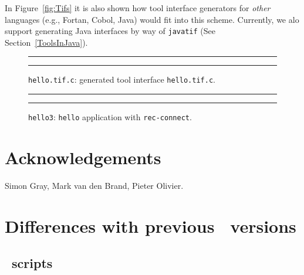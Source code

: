 \documentclass[a4,twoside,noweb]{article} %
\begin{document}
In Figure~\ref{fig:Tifs} it is also shown how tool interface generators for
{\em other} languages (e.g., Fortan, Cobol, Java) would fit into this scheme.
Currently, we alo support generating Java interfaces by way of {\tt javatif}
(See Section~\ref{ToolsInJava}).

\begin{figure}[tb]
\rule{\textwidth}{0.5mm}

  \caption{{\tt hello.tif.c}: generated tool interface {\tt hello.tif.c}.}
  \label{fig:hello.tif.c}
\rule{\textwidth}{0.5mm}
\end{figure}


\begin{figure}[tb]
\rule{\textwidth}{0.5mm}

  \caption{{\tt hello3}: {\tt hello} application with {\tt rec-connect}.}
  \label{fig:hello3.tb}
\rule{\textwidth}{0.5mm}
\end{figure}




\section*{Acknowledgements}
Simon Gray, Mark van den Brand, Pieter Olivier.
\appendix


\newpage
\section{Differences with previous \TB\ versions}

\subsection{\T\ scripts}
\end{document}
